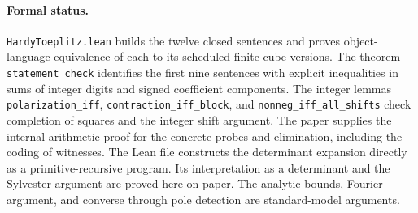 \paragraph{Formal status.}
\texttt{HardyToeplitz.lean} builds the twelve closed sentences and proves object-language equivalence of each to its scheduled finite-cube versions. The theorem \texttt{statement\_check} identifies the first nine sentences with explicit inequalities in sums of integer digits and signed coefficient components. The integer lemmas \texttt{polarization\_iff}, \texttt{contraction\_iff\_block}, and \texttt{nonneg\_iff\_all\_shifts} check completion of squares and the integer shift argument. The paper supplies the internal arithmetic proof for the concrete probes and elimination, including the coding of witnesses. The Lean file constructs the determinant expansion directly as a primitive-recursive program. Its interpretation as a determinant and the Sylvester argument are proved here on paper. The analytic bounds, Fourier argument, and converse through pole detection are standard-model arguments.
